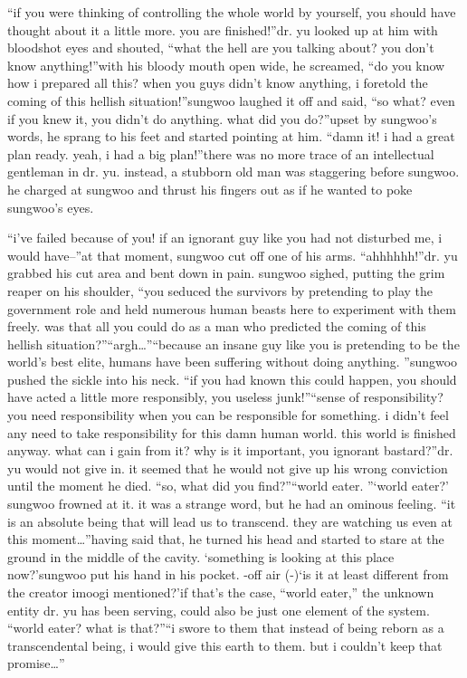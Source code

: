 “if you were thinking of controlling the whole world by yourself, you should have thought about it a little more.
 you are finished!”dr.
 yu looked up at him with bloodshot eyes and shouted, “what the hell are you talking about? you don’t know anything!”with his bloody mouth open wide, he screamed, “do you know how i prepared all this? when you guys didn’t know anything, i foretold the coming of this hellish situation!”sungwoo laughed it off and said, “so what? even if you knew it, you didn’t do anything.
 what did you do?”upset by sungwoo’s words, he sprang to his feet and started pointing at him.
“damn it! i had a great plan ready.
 yeah, i had a big plan!”there was no more trace of an intellectual gentleman in dr.
 yu.
 instead, a stubborn old man was staggering before sungwoo.
 he charged at sungwoo and thrust his fingers out as if he wanted to poke sungwoo’s eyes.


“i’ve failed because of you! if an ignorant guy like you had not disturbed me, i would have–”at that moment, sungwoo cut off one of his arms.
“ahhhhhh!”dr.
 yu grabbed his cut area and bent down in pain.
sungwoo sighed, putting the grim reaper on his shoulder, “you seduced the survivors by pretending to play the government role and held numerous human beasts here to experiment with them freely.
 was that all you could do as a man who predicted the coming of this hellish situation?”“argh…”“because an insane guy like you is pretending to be the world’s best elite, humans have been suffering without doing anything.
”sungwoo pushed the sickle into his neck.
“if you had known this could happen, you should have acted a little more responsibly, you useless junk!”“sense of responsibility? you need responsibility when you can be responsible for something.
 i didn’t feel any need to take responsibility for this damn human world.
 this world is finished anyway.
 what can i gain from it? why is it important, you ignorant bastard?”dr.
 yu would not give in.
 it seemed that he would not give up his wrong conviction until the moment he died.
“so, what did you find?”“world eater.
”‘world eater?’ sungwoo frowned at it.
 it was a strange word, but he had an ominous feeling.
“it is an absolute being that will lead us to transcend.
 they are watching us even at this moment…”having said that, he turned his head and started to stare at the ground in the middle of the cavity.
‘something is looking at this place now?’sungwoo put his hand in his pocket.
-off air (-)‘is it at least different from the creator imoogi mentioned?’if that’s the case, “world eater,” the unknown entity dr.
 yu has been serving, could also be just one element of the system.
“world eater? what is that?”“i swore to them that instead of being reborn as a transcendental being, i would give this earth to them.
 but i couldn’t keep that promise…”

 